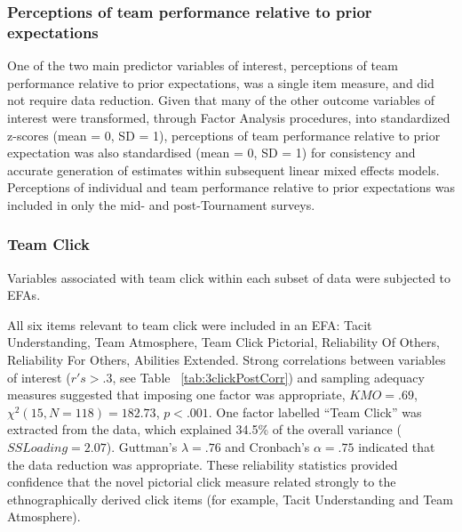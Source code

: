 \subsubsection{Perceptions of team performance relative to prior expectations}
One of the two main predictor variables of interest, perceptions of team performance relative to prior expectations, was a single item measure, and did not require data reduction.  Given that many of the other outcome variables of interest were transformed, through Factor Analysis procedures, into standardized z-scores (mean = 0, SD = 1), perceptions of team performance relative to prior expectation was also standardised (mean = 0, SD = 1) for consistency and accurate generation of estimates within subsequent linear mixed effects models. Perceptions of individual and team performance relative to prior expectations was included in only the mid- and post-Tournament surveys.


\subsubsection{Team Click}
Variables associated with team click within each subset of data were subjected to EFAs.

All six items relevant to team click were included in an EFA: Tacit Understanding, Team Atmosphere, Team Click Pictorial, Reliability Of Others, Reliability For Others, Abilities Extended.  Strong correlations between variables of interest ($r's > .3$, see Table ~\ref{tab:3clickPostCorr}) and sampling adequacy measures suggested that imposing one factor was appropriate, $KMO =  .69$, $\chi^2(15, N = 118) = 182.73$, $p < .001$.  One factor labelled ``Team Click'' was extracted from the data, which explained 34.5\% of the overall variance ($SS Loading = 2.07$).  Guttman's $\lambda =.76$ and Cronbach's $\alpha = .75$ indicated that the data reduction was appropriate.  These reliability statistics provided confidence that the novel pictorial click measure related strongly to the ethnographically derived click items (for example, Tacit Understanding and Team Atmosphere).

